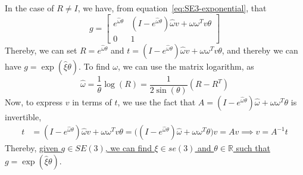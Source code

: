 In the case of \( R \neq I \), we have, from equation~\eqref{eq:SE3-exponential}, that
\begin{equation*}
      g
      =
      \begin{bmatrix}
            e^{\hat \omega \theta}
              &
            (I - e^{\hat \omega \theta}) \hat \omega v + \omega \omega^T v \theta
            \\
            0 & 1
      \end{bmatrix}
\end{equation*}
Thereby, we can set \( R = e^{\hat \omega \theta} \) and \( t = (I - e^{\hat \omega \theta}) \hat \omega v + \omega \omega^T v \theta \), and thereby we can have \( g = \exp(\hat{\xi} \theta) \).
To find \( \omega \), we can use the matrix logarithm, as
\begin{equation*}
      \hat\omega = \frac{1}{\theta} \log(R) = \frac{1}{2 \sin(\theta)} \left( R - R^T \right)
\end{equation*}
Now, to express \( v \) in terms of \( t \), we use the fact that \( A = \left(I-e^{\hat{\omega} \theta}\right) \hat{\omega}+\omega \omega^{T} \theta \) is invertible,
\begin{align*}
      t
       & =
      (I - e^{\hat \omega \theta}) \hat \omega v + \omega \omega^T v \theta
      =
      \Big( (I - e^{\hat \omega \theta}) \hat \omega + \omega \omega^T \theta \Big) v
      =
      A v
      \implies
      v
      =
      A^{-1} t
\end{align*}
Thereby, \underline{given \( g \in SE(3) \), we can find \( \xi \in se(3) \) and \( \theta \in \mathbb{R} \) such that \( g = \exp(\hat{\xi} \theta) \)}.
